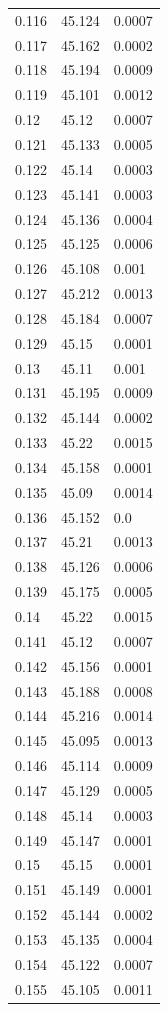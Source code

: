 \begin{table}[H]
\begin{tabular}{lll}
0.116 & 45.124 & 0.0007 \\
0.117 & 45.162 & 0.0002 \\
0.118 & 45.194 & 0.0009 \\
0.119 & 45.101 & 0.0012 \\
0.12 & 45.12 & 0.0007 \\
0.121 & 45.133 & 0.0005 \\
0.122 & 45.14 & 0.0003 \\
0.123 & 45.141 & 0.0003 \\
0.124 & 45.136 & 0.0004 \\
0.125 & 45.125 & 0.0006 \\
0.126 & 45.108 & 0.001 \\
0.127 & 45.212 & 0.0013 \\
0.128 & 45.184 & 0.0007 \\
0.129 & 45.15 & 0.0001 \\
0.13 & 45.11 & 0.001 \\
0.131 & 45.195 & 0.0009 \\
0.132 & 45.144 & 0.0002 \\
0.133 & 45.22 & 0.0015 \\
0.134 & 45.158 & 0.0001 \\
0.135 & 45.09 & 0.0014 \\
0.136 & 45.152 & 0.0 \\
0.137 & 45.21 & 0.0013 \\
0.138 & 45.126 & 0.0006 \\
0.139 & 45.175 & 0.0005 \\
0.14 & 45.22 & 0.0015 \\
0.141 & 45.12 & 0.0007 \\
0.142 & 45.156 & 0.0001 \\
0.143 & 45.188 & 0.0008 \\
0.144 & 45.216 & 0.0014 \\
0.145 & 45.095 & 0.0013 \\
0.146 & 45.114 & 0.0009 \\
0.147 & 45.129 & 0.0005 \\
0.148 & 45.14 & 0.0003 \\
0.149 & 45.147 & 0.0001 \\
0.15 & 45.15 & 0.0001 \\
0.151 & 45.149 & 0.0001 \\
0.152 & 45.144 & 0.0002 \\
0.153 & 45.135 & 0.0004 \\
0.154 & 45.122 & 0.0007 \\
0.155 & 45.105 & 0.0011 \\

\end{tabular}
\end{table}
